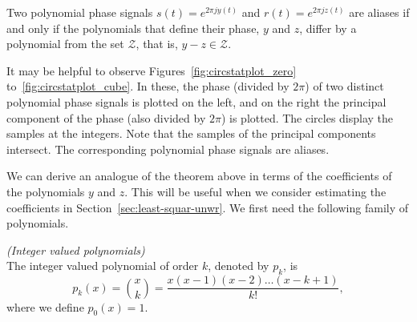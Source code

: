 \documentclass[journal]{IEEEtran}
\begin{document}
\begin{theorem}\label{thm:circpolysampledthm}
Two polynomial phase signals $s(t) = e^{2\pi j y(t)}$  and $r(t) = e^{2\pi j z(t)}$  are aliases if and only if the polynomials that define their phase, $y$ and $z$, differ by a polynomial from the set $\mathcal{Z}$, that is, $y - z \in \mathcal{Z}$.
\end{theorem}



It may be helpful to observe Figures~\ref{fig:circstatplot_zero} to~\ref{fig:circstatplot_cube}.  In these, the phase (divided by $2\pi$) of two distinct polynomial phase signals is plotted on the left, and on the right the principal component of the phase (also divided by $2\pi$) is plotted. The circles display the samples at the integers. Note that the samples of the principal components intersect.  The corresponding polynomial phase signals are aliases.

We can derive an analogue of the theorem above in terms of the coefficients of the polynomials $y$ and $z$. This will be useful when we consider estimating the coefficients in Section~\ref{sec:least-squar-unwr}.  We first need the following family of polynomials. 

\begin{definition} \emph{(Integer valued polynomials)} \label{def:intvaledpolys}
\\The integer valued polynomial of order $k$, denoted by $p_k$, is
\[
p_k(x) = \binom{x}{k} = \frac{x(x-1)(x-2)\dots(x-k+1)}{k!},
\]
where we define $p_0(x) = 1$.
\end{definition}
\end{document}
